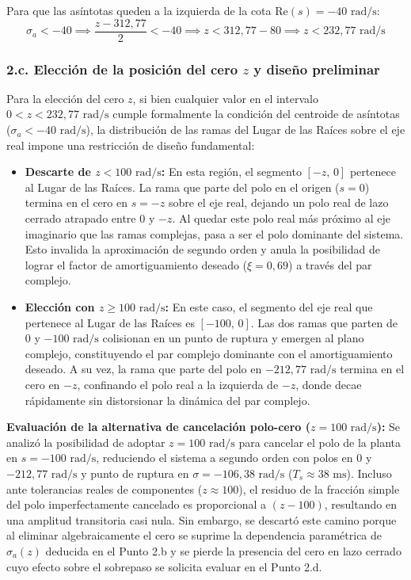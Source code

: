 \documentclass[11pt,a4paper]{article}
\begin{document}
Para que las asíntotas queden a la izquierda de la cota $\text{Re}(s) = -40\text{ rad/s}$:
\begin{equation}
    \sigma_a < -40 \implies \frac{z - 312{,}77}{2} < -40 \implies z < 312{,}77 - 80 \implies z < 232{,}77\text{ rad/s}
\end{equation}

\subsubsection*{2.c. Elección de la posición del cero $z$ y diseño preliminar}
Para la elección del cero $z$, si bien cualquier valor en el intervalo $0 < z < 232{,}77\text{ rad/s}$ cumple formalmente la condición del centroide de asíntotas ($\sigma_a < -40\text{ rad/s}$), la distribución de las ramas del Lugar de las Raíces sobre el eje real impone una restricción de diseño fundamental:
\begin{itemize}
    \item \textbf{Descarte de $z < 100\text{ rad/s}$:} En esta región, el segmento $[-z,\, 0]$ pertenece al Lugar de las Raíces. La rama que parte del polo en el origen ($s = 0$) termina en el cero en $s = -z$ sobre el eje real, dejando un polo real de lazo cerrado atrapado entre $0$ y $-z$. Al quedar este polo real más próximo al eje imaginario que las ramas complejas, pasa a ser el polo dominante del sistema. Esto invalida la aproximación de segundo orden y anula la posibilidad de lograr el factor de amortiguamiento deseado ($\xi = 0{,}69$) a través del par complejo.
    \item \textbf{Elección con $z \ge 100\text{ rad/s}$:} En este caso, el segmento del eje real que pertenece al Lugar de las Raíces es $[-100,\, 0]$. Las dos ramas que parten de $0$ y $-100\text{ rad/s}$ colisionan en un punto de ruptura y emergen al plano complejo, constituyendo el par complejo dominante con el amortiguamiento deseado. A su vez, la rama que parte del polo en $-212{,}77\text{ rad/s}$ termina en el cero en $-z$, confinando el polo real a la izquierda de $-z$, donde decae rápidamente sin distorsionar la dinámica del par complejo.
\end{itemize}

\textbf{Evaluación de la alternativa de cancelación polo-cero ($z = 100\text{ rad/s}$):}
Se analizó la posibilidad de adoptar $z = 100\text{ rad/s}$ para cancelar el polo de la planta en $s = -100\text{ rad/s}$, reduciendo el sistema a segundo orden con polos en $0$ y $-212{,}77\text{ rad/s}$ y punto de ruptura en $\sigma = -106{,}38\text{ rad/s}$ ($T_s \approx 38\text{ ms}$). Incluso ante tolerancias reales de componentes ($z \approx 100$), el residuo de la fracción simple del polo imperfectamente cancelado es proporcional a $(z - 100)$, resultando en una amplitud transitoria casi nula. Sin embargo, se descartó este camino porque al eliminar algebraicamente el cero se suprime la dependencia paramétrica de $\sigma_a(z)$ deducida en el Punto 2.b y se pierde la presencia del cero en lazo cerrado cuyo efecto sobre el sobrepaso se solicita evaluar en el Punto 2.d.
\end{document}
